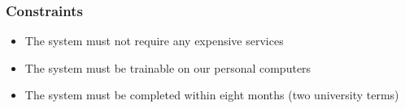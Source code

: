 \subsubsection{Constraints}
\begin{itemize}
\item The system must not require any expensive services
\item The system must be trainable on our personal computers
\item The system must be completed within eight months (two university terms)
\end{itemize}